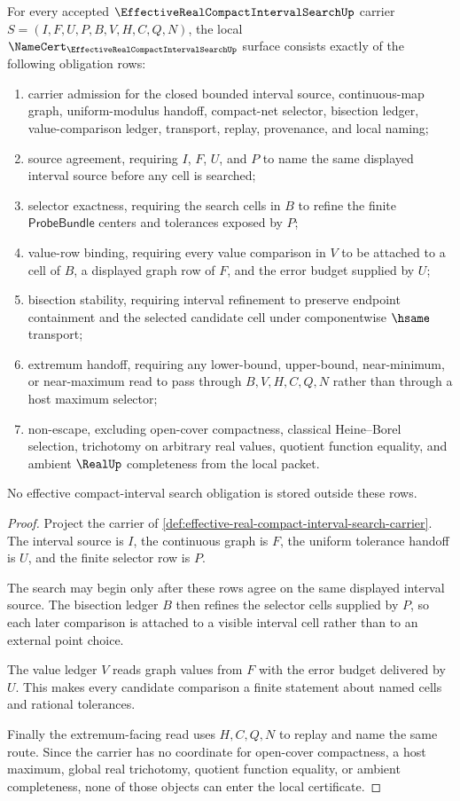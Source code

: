 \begin{theorem}
\label{thm:effective-real-compact-interval-search-namecert-obligations}
For every accepted $\EffectiveRealCompactIntervalSearchUp$ carrier $S=(I,F,U,P,B,V,H,C,Q,N)$, the local $\NameCert_{\EffectiveRealCompactIntervalSearchUp}$ surface consists exactly of the following obligation rows:
\begin{enumerate}
\item carrier admission for the closed bounded interval source, continuous-map graph, uniform-modulus handoff, compact-net selector, bisection ledger, value-comparison ledger, transport, replay, provenance, and local naming;
\item source agreement, requiring $I$, $F$, $U$, and $P$ to name the same displayed interval source before any cell is searched;
\item selector exactness, requiring the search cells in $B$ to refine the finite $\mathsf{ProbeBundle}$ centers and tolerances exposed by $P$;
\item value-row binding, requiring every value comparison in $V$ to be attached to a cell of $B$, a displayed graph row of $F$, and the error budget supplied by $U$;
\item bisection stability, requiring interval refinement to preserve endpoint containment and the selected candidate cell under componentwise $\hsame$ transport;
\item extremum handoff, requiring any lower-bound, upper-bound, near-minimum, or near-maximum read to pass through $B,V,H,C,Q,N$ rather than through a host maximum selector;
\item non-escape, excluding open-cover compactness, classical Heine--Borel selection, trichotomy on arbitrary real values, quotient function equality, and ambient $\RealUp$ completeness from the local packet.
\end{enumerate}
No effective compact-interval search obligation is stored outside these rows.
\end{theorem}
\begin{proof}
Project the carrier of \autoref{def:effective-real-compact-interval-search-carrier}. The interval source is $I$, the continuous graph is $F$, the uniform tolerance handoff is $U$, and the finite selector row is $P$.

The search may begin only after these rows agree on the same displayed interval source. The bisection ledger $B$ then refines the selector cells supplied by $P$, so each later comparison is attached to a visible interval cell rather than to an external point choice.

The value ledger $V$ reads graph values from $F$ with the error budget delivered by $U$. This makes every candidate comparison a finite statement about named cells and rational tolerances.

Finally the extremum-facing read uses $H,C,Q,N$ to replay and name the same route. Since the carrier has no coordinate for open-cover compactness, a host maximum, global real trichotomy, quotient function equality, or ambient completeness, none of those objects can enter the local certificate.
\end{proof}

